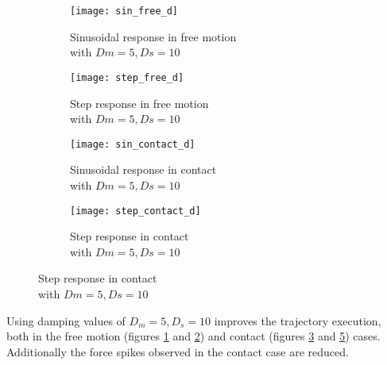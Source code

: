 \begin{figure}[H]
\begin{minipage}{0.5\textwidth}
\begin{figure}[H]
\texttt{[image: sin\_free\_d]}
\caption{Sinusoidal response in free motion\\ with $Dm=5,Ds=10$}
\label{fig:sin_free_d}
\end{figure}
\begin{figure}[H]
\texttt{[image: step\_free\_d]}
\caption{Step response in free motion\\ with $Dm=5,Ds=10$}
\label{fig:step_free_d}
\end{figure}
\end{minipage}
\begin{minipage}{0.5\textwidth}
\begin{figure}[H]
\texttt{[image: sin\_contact\_d]}
\caption{Sinusoidal response in contact\\ with $Dm=5,Ds=10$}
\label{fig:sin_contact_d}
\end{figure}
\begin{figure}[H]
\texttt{[image: step\_contact\_d]}
\caption{Step response in contact\\\hspace{\textwidth} with $Dm=5,Ds=10$}
\label{fig:step_contact_d}
\end{figure}
\end{minipage}
\end{figure}

Using damping values of $D_m=5,D_s=10$ improves the trajectory execution, both in the free motion (figures \ref{fig:sin_free_d} and \ref{fig:step_free_d}) and contact (figures \ref{fig:sin_contact_d} and \ref{fig:step_contact_d}) cases. Additionally the force spikes observed in the contact case are reduced.